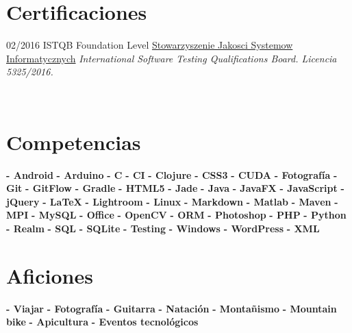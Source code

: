 \documentclass[]{friggeri-cv}
\begin{document}
\section{Certificaciones}
\begin{entrylist}
  \entry
    {02/2016}
    {ISTQB Foundation Level}
    {\href{http://sjsi.org/}{Stowarzyszenie Jakosci Systemow Informatycznych}}
    {\emph{International Software Testing Qualifications Board. Licencia 5325/2016.}}
\end{entrylist}

\newpage

\begin{aside}
~
~
~
  \section{\vspace{0.49cm}Competencias}
    \textbf{- Android}
    \textbf{- Arduino}
    \textbf{- C}
    \textbf{- CI}    
    \textbf{- Clojure}
    \textbf{- CSS3}
    \textbf{- CUDA}
    \textbf{- Fotografía}
    \textbf{- Git}
    \textbf{- GitFlow}    
    \textbf{- Gradle}
    \textbf{- HTML5}
    \textbf{- Jade}
    \textbf{- Java}
    \textbf{- JavaFX}
    \textbf{- JavaScript}
    \textbf{- jQuery}
    \textbf{- \LaTeX}
    \textbf{- Lightroom}
    \textbf{- Linux}
    \textbf{- Markdown}
    \textbf{- Matlab}
    \textbf{- Maven}
    \textbf{- MPI}
    \textbf{- MySQL}
    \textbf{- Office}
    \textbf{- OpenCV}
    \textbf{- ORM}
    \textbf{- Photoshop}
    \textbf{- PHP}
    \textbf{- Python}
    \textbf{- Realm}
    \textbf{- SQL}
    \textbf{- SQLite}    
    \textbf{- Testing}
    \textbf{- Windows}
    \textbf{- WordPress}
    \textbf{- XML}
    ~
  \section{Aficiones}
    \textbf{- Viajar}
    \textbf{- Fotografía}
    \textbf{- Guitarra}
    \textbf{- Natación}
    \textbf{- Montañismo}
    \textbf{- Mountain bike}    
    \textbf{- Apicultura}
    \textbf{- Eventos tecnológicos}
    ~
\end{aside}
\end{document}
